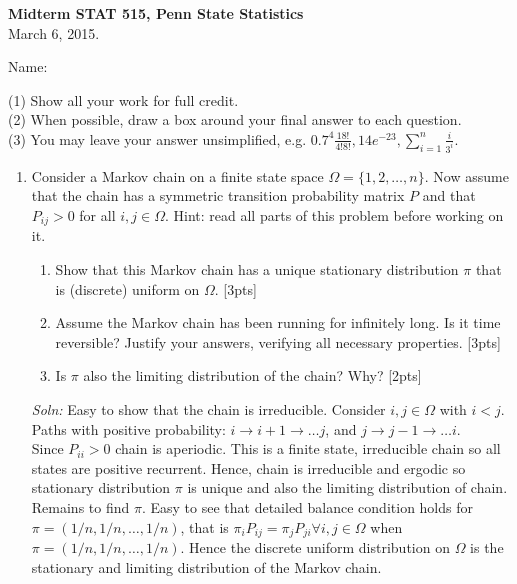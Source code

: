 \documentclass[12pt]{article}
\begin{document}
\begin{center}
{\bf  Midterm STAT 515, Penn State Statistics}\\ 
{March 6, 2015.}
\end{center}
\begin{flushleft}
Name: %
\end{flushleft}

\noindent (1) Show all your work for full credit.\\
(2) When possible, draw a box around your final answer to each question.\\
(3) You may leave your answer unsimplified, e.g. $0.7^{4} \frac{18!}{4!8!}, 14 e^{-23}, \sum_{i=1}^n \frac{i}{3^i}$.
\begin{enumerate}

\item Consider a Markov chain on a finite state space
  $\Omega=\{1,2,\dots,n\}$. Now assume that the chain has a symmetric
  transition probability matrix $P$ and that $P_{ij}>0$ for all
  $i,j\in \Omega$. Hint: read all parts of this problem before working
  on it.
\begin{enumerate}
\item Show that this Markov chain has a unique stationary distribution
  $\pi$ that is (discrete) uniform on $\Omega$. [3pts]
\item Assume the Markov chain has been running for infinitely long. Is
  it time reversible?  Justify your answers, verifying
  all necessary properties. [3pts]
\item Is $\pi$ also the limiting distribution of the chain? Why? [2pts]
\end{enumerate}
  {\it Soln:} Easy to show that the chain is irreducible. Consider $i,j \in \Omega$ with $i< j$. Paths with positive probability: $i\rightarrow i+1 \rightarrow \dots j$, and $j\rightarrow j-1 \rightarrow \dots i$. \\
  Since $P_{ii}>0$ chain is aperiodic. This is a finite state,
  irreducible chain so all states are positive recurrent. Hence, chain
  is irreducible and ergodic so stationary distribution $\pi$ is
  unique and also the limiting distribution of chain. Remains to find
  $\pi$.  Easy to see that detailed balance condition holds for $\pi =
  (1/n,1/n,\dots, 1/n)$, that is $\pi_i P_{ij} = \pi_j P_{ji} \forall
  i,j \in \Omega$ when $\pi = (1/n,1/n,\dots, 1/n)$. Hence the
  discrete uniform distribution on $\Omega$ is the stationary and
  limiting distribution of the Markov chain.


\end{enumerate}
\end{document}
